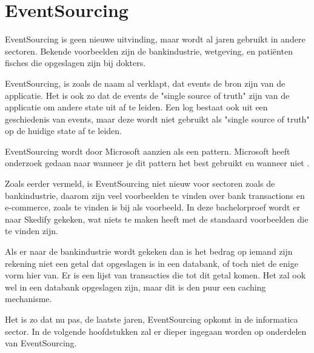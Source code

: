 
\chapter{EventSourcing}
\label{ch:eventsourcing}

EventSourcing is geen nieuwe uitvinding, maar wordt al jaren gebruikt in andere sectoren. Bekende voorbeelden zijn de bankindustrie, wetgeving, en patiënten fisches die opgeslagen zijn bij dokters.

EventSourcing, is zoals de naam al verklapt, dat events de bron zijn van de applicatie. Het is ook zo dat de events de "single source of truth" zijn van de applicatie om andere state uit af te leiden. Een log bestaat ook uit een geschiedenis van events, maar deze wordt niet gebruikt als "single source of truth" op de huidige state af te leiden.

EventSourcing wordt door Microsoft aanzien als een pattern. Microsoft heeft onderzoek gedaan naar wanneer je dit pattern het best gebruikt en wanneer niet \autocite{Microsoft2017ES}.

Zoals eerder vermeld, is EventSourcing niet nieuw voor sectoren zoals de bankindustrie, daarom zijn veel voorbeelden te vinden over bank transactions en e-commerce, zoals te vinden is bij \textcite{Microsoft2017ES} als voorbeeld. In deze bachelorproef wordt er naar Skedify gekeken, wat niets te maken heeft met de standaard voorbeelden die te vinden zijn.

Als er naar de bankindustrie wordt gekeken dan is het bedrag op iemand zijn rekening niet een getal dat opgeslagen is in een databank, of toch niet de enige vorm hier van. Er is een lijst van transacties die tot dit getal komen. Het zal ook wel in een databank opgeslagen zijn, maar dit is den puur een caching mechanisme.

Het is zo dat nu pas, de laatste jaren, EventSourcing opkomt in de informatica sector. In de volgende hoofdstukken zal er dieper ingegaan worden op onderdelen van EventSourcing.